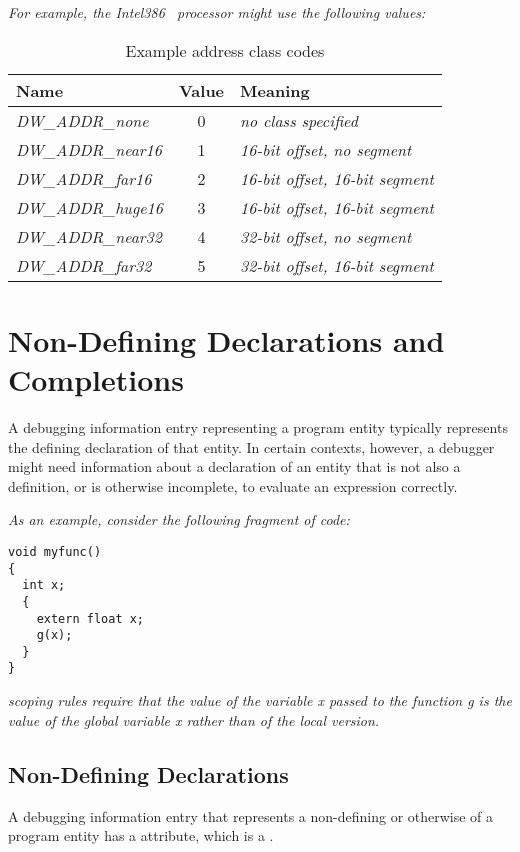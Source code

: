 \textit {For example, the Intel386 \texttrademark\  processor might use the following values:}

\begin{table}[here]
\caption{Example address class codes}
\label{tab:inteladdressclasstable}
\centering
\begin{tabular}{l|c|l}
\hline
Name&Value&Meaning  \\
\hline
\textit{DW\_ADDR\_none}&   0 & \textit{no class specified} \\
\textit{DW\_ADDR\_near16}& 1 & \textit{16-bit offset, no segment} \\
\textit{DW\_ADDR\_far16}&  2 & \textit{16-bit offset, 16-bit segment} \\
\textit{DW\_ADDR\_huge16}& 3 & \textit{16-bit offset, 16-bit segment} \\
\textit{DW\_ADDR\_near32}& 4 & \textit{32-bit offset, no segment} \\
\textit{DW\_ADDR\_far32}&  5 & \textit{32-bit offset, 16-bit segment} \\
\hline
\end{tabular}
\end{table}

\section{Non-Defining Declarations and Completions}
\label{nondefiningdeclarationsandcompletions}
A debugging information entry representing a program entity
typically represents the defining declaration of that
entity. In certain contexts, however, a debugger might need
information about a declaration of an entity that is not
also a definition, or is otherwise incomplete, to evaluate
\hypertarget{chap:DWATdeclarationincompletenondefiningorseparateentitydeclaration}{}
an expression correctly.

\textit{As an example, consider the following fragment of  code:}

\begin{lstlisting}
void myfunc()
{
  int x;
  {
    extern float x;
    g(x);
  }
}
\end{lstlisting}


\textit{ scoping rules require that the 
value of the variable x passed to the function g is the value of the
global variable x rather than of the local version.}

\subsection{Non-Defining Declarations}
A debugging information entry that 
represents a non-defining 
or otherwise 
of a program entity has a
\DWATdeclaration{} attribute, which is a 
.


